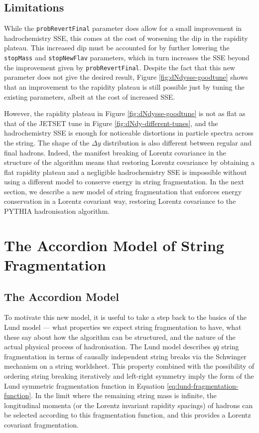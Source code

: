 \documentclass[12pt,a4paper]{report}
\begin{document}
\section{Limitations}
\begin{sloppypar} While the \texttt{probRevertFinal} parameter does allow for a small improvement in hadrochemistry SSE, this comes at the cost of worsening the dip in the rapidity plateau. This increased dip must be accounted for by further lowering the \texttt{stopMass} and \texttt{stopNewFlav} parameters, which in turn increases the SSE beyond the improvement given by \texttt{probRevertFinal}. Despite the fact that this new parameter does not give the desired result, Figure \ref{fig:dNdysse-goodtune} shows that an improvement to the rapidity plateau is still possible just by tuning the existing parameters, albeit at the cost of increased SSE. \end{sloppypar}

However, the rapidity plateau in Figure \ref{fig:dNdysse-goodtune} is not as flat as that of the JETSET tune in Figure \ref{fig:dNdy-different-tunes}, and the hadrochemistry SSE is enough for noticeable distortions in particle spectra across the string. The shape of the $\Delta y$ distribution is also different between regular and final hadrons. Indeed, the manifest breaking of Lorentz covariance in the structure of the algorithm means that restoring Lorentz covariance by obtaining a flat rapidity plateau and a negligible hadrochemistry SSE is impossible without using a different model to conserve energy in string fragmentation. In the next section, we describe a new model of string fragmentation that enforces energy conservation in a Lorentz covariant way, restoring Lorentz covariance to the PYTHIA hadronisation algorithm.

\chapter{The Accordion Model of String Fragmentation}
\label{chap:accordion}
\section{The Accordion Model}
To motivate this new model, it is useful to take a step back to the basics of the Lund model --- what properties we expect string fragmentation to have, what these say about how the algorithm can be structured, and the nature of the actual physical process of hadronisation. The Lund model describes $q\bar{q}$ string fragmentation in terms of causally independent string breaks via the Schwinger mechanism on a string worldsheet. This property combined with the possibility of ordering string breaking iteratively and left-right symmetry imply the form of the Lund symmetric fragmentation function in Equation \eqref{eq:lund-fragmentation-function}. In the limit where the remaining string mass is infinite, the longitudinal momenta (or the Lorentz invariant rapidity spacings) of hadrons can be selected according to this fragmentation function, and this provides a Lorentz covariant fragmentation.
\end{document}
